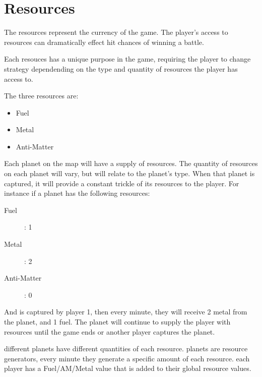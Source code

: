 \section{Resources}

\begin{comment}

what are resources

for each resources:
  - what it's used for
  - how it effects the game
  - how its earned

mention what their used for

\end{comment}

The resources represent the currency of the game. The player's access to resources can dramatically effect hit chances of winning a battle.

Each resouces has a unique purpose in the game, requiring the player to change strategy dependending on the type and quantity of resources the player has access to.

The three resources are:
\begin{itemize}
\item Fuel
\item Metal
\item Anti-Matter
\end{itemize}

Each planet on the map will have a supply of resources. 
The quantity of resources on each planet will vary, but will relate to the planet's type.
When that planet is captured, it will provide a constant trickle of its resources to the player.
For instance if a planet has the following resources:
\begin{description}
\item[Fuel]: 1
\item[Metal]: 2
\item[Anti-Matter]: 0
\end{description}
And is captured by player 1, then every minute, they will receive 2 metal from the planet, and 1 fuel. 
The planet will continue to supply the player with resources until the game ends or another player captures the planet.






		different planets have different quantities of each resource.
		planets are resource generators, every minute they generate a specific amount of each resource.
		each player has a Fuel/AM/Metal value that is added to their global resource values.

